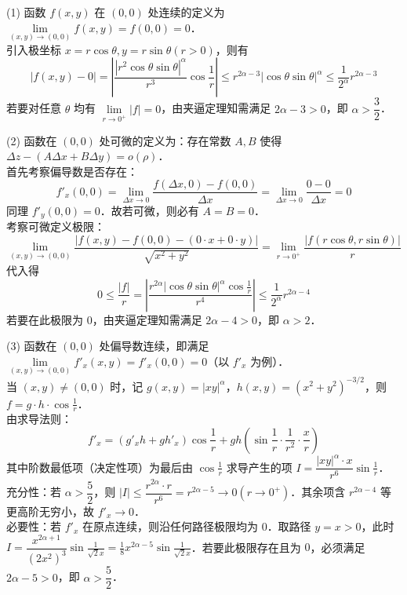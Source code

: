 \documentclass[12pt, a4paper, oneside, UTF8]{ctexbook}
\begin{document}
\begin{solution}
    (1) 函数 $f(x,y)$ 在 $(0,0)$ 处连续的定义为 $\lim\limits_{(x,y) \to (0,0)} f(x,y) = f(0,0) = 0$．\\
    引入极坐标 $x = r\cos\theta, y = r\sin\theta (r>0)$，则有
    \[ |f(x,y) - 0| = \left| \frac{|r^2\cos\theta\sin\theta|^\alpha}{r^3} \cos\frac{1}{r} \right| \le r^{2\alpha-3} |\cos\theta\sin\theta|^\alpha \le \frac{1}{2^\alpha} r^{2\alpha-3} \]
    若要对任意 $\theta$ 均有 $\lim\limits_{r \to 0^+} |f| = 0$，由夹逼定理知需满足 $2\alpha - 3 > 0$，即 $\boxed{\alpha > \dfrac{3}{2}}$．

    (2) 函数在 $(0,0)$ 处可微的定义为：存在常数 $A, B$ 使得 $\Delta z - (A\Delta x + B\Delta y) = o(\rho)$．\\
    首先考察偏导数是否存在：
    \[ f'_x(0,0) = \lim_{\Delta x \to 0} \frac{f(\Delta x, 0) - f(0,0)}{\Delta x} = \lim_{\Delta x \to 0} \frac{0 - 0}{\Delta x} = 0 \]
    同理 $f'_y(0,0) = 0$．故若可微，则必有 $A=B=0$．\\
    考察可微定义极限：
    \[ \lim_{(x,y) \to (0,0)} \frac{|f(x,y) - f(0,0) - (0 \cdot x + 0 \cdot y)|}{\sqrt{x^2+y^2}} = \lim_{r \to 0^+} \frac{|f(r\cos\theta, r\sin\theta)|}{r} \]
    代入得
    \[ 0 \le \frac{|f|}{r} = \left| \frac{r^{2\alpha}|\cos\theta\sin\theta|^\alpha \cos\frac{1}{r}}{r^4} \right| \le \frac{1}{2^\alpha} r^{2\alpha-4} \]
    若要在此极限为 $0$，由夹逼定理知需满足 $2\alpha - 4 > 0$，即 $\boxed{\alpha > 2}$．

    (3) 函数在 $(0,0)$ 处偏导数连续，即满足 $\lim\limits_{(x,y) \to (0,0)} f'_x(x,y) = f'_x(0,0) = 0$（以 $f'_x$ 为例）．\\
    当 $(x,y) \ne (0,0)$ 时，记 $g(x,y) = |xy|^\alpha$，$h(x,y) = (x^2+y^2)^{-3/2}$，则 $f = g \cdot h \cdot \cos\frac{1}{r}$．\\
    由求导法则：
    \[ f'_x = (g'_x h + g h'_x) \cos\frac{1}{r} + g h \left( \sin\frac{1}{r} \cdot \frac{1}{r^2} \cdot \frac{x}{r} \right) \]
    其中阶数最低项（决定性项）为最后由 $\cos\frac{1}{r}$ 求导产生的项 $I = \dfrac{|xy|^\alpha \cdot x}{r^6} \sin\frac{1}{r}$．\\
    充分性：若 $\alpha > \dfrac{5}{2}$，则 $|I| \le \dfrac{r^{2\alpha} \cdot r}{r^6} = r^{2\alpha-5} \to 0 (r \to 0^+)$．其余项含 $r^{2\alpha-4}$ 等更高阶无穷小，故 $f'_x \to 0$．\\
    必要性：若 $f'_x$ 在原点连续，则沿任何路径极限均为 $0$．取路径 $y=x > 0$，此时 $I = \dfrac{x^{2\alpha+1}}{(2x^2)^3} \sin\frac{1}{\sqrt{2}x} = \frac{1}{8} x^{2\alpha-5} \sin\frac{1}{\sqrt{2}x}$．若要此极限存在且为 $0$，必须满足 $2\alpha - 5 > 0$，即 $\boxed{\alpha > \dfrac{5}{2}}$．
\end{solution}
\end{document}
